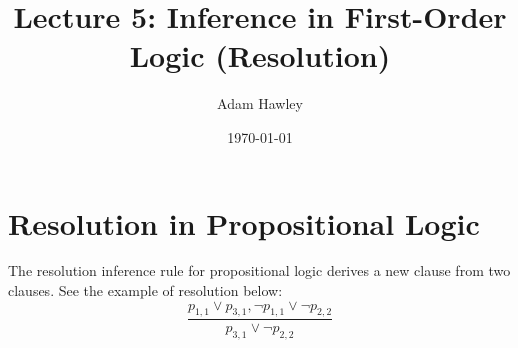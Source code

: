 \documentclass[11pt]{article}
\author{Adam Hawley}
\date{\today}
\title{Lecture 5: Inference in First-Order Logic (Resolution)}
\begin{document}
\maketitle
\tableofcontents


\section{Resolution in Propositional Logic}
\label{sec:org5f87c1a}
The resolution inference rule for propositional logic derives a new clause from two clauses.
See the example of resolution below:
\begin{equation}
\frac{p_{1,1} \lor p_{3,1}, ¬p_{1,1} \lor ¬p_{2,2}}{p_{3,1} \lor ¬p_{2,2}}
\end{equation}
\end{document}
